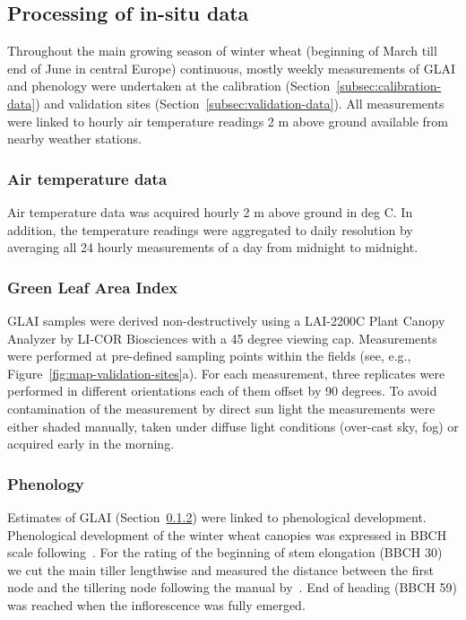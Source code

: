 \subsection{Processing of in-situ data}
Throughout the main growing season of winter wheat (beginning of March till end of June in central Europe) continuous, mostly weekly measurements of \gls{GLAI} and phenology were undertaken at the calibration (Section~\ref{subsec:calibration-data}) and validation sites (Section~\ref{subsec:validation-data}). All measurements were linked to hourly air temperature readings 2 m above ground available from nearby weather stations.

\subsubsection{Air temperature data}
Air temperature data was acquired hourly 2 m above ground in deg C. In addition, the temperature readings were aggregated to daily resolution by averaging all 24 hourly measurements of a day from midnight to midnight.

\subsubsection{Green Leaf Area Index}
\label{subsubsec:glai-processing}
\gls{GLAI} samples were derived non-destructively using a LAI-2200C Plant Canopy Analyzer by LI-COR Biosciences with a 45 degree viewing cap. Measurements were performed at pre-defined sampling points within the fields (see, e.g., Figure~\ref{fig:map-validation-sites}a). For each measurement, three replicates were performed in different orientations each of them offset by 90 degrees. To avoid contamination of the measurement by direct sun light the measurements were either shaded manually, taken under diffuse light conditions (over-cast sky, fog) or acquired early in the morning.

\subsubsection{Phenology}
\label{subsubsec:phenology-processing}
Estimates of \gls{GLAI} (Section~\ref{subsubsec:glai-processing}) were linked to phenological development.
Phenological development of the winter wheat canopies was expressed in \gls{BBCH} scale following~\cite{lancashire_uniform_1991}. For the rating of the beginning of stem elongation (BBCH 30) we cut the main tiller lengthwise and measured the distance between the first node and the tillering node following the manual by~\cite{pask_physiological_2012}. End of heading (BBCH 59) was reached when the inflorescence was fully emerged.

